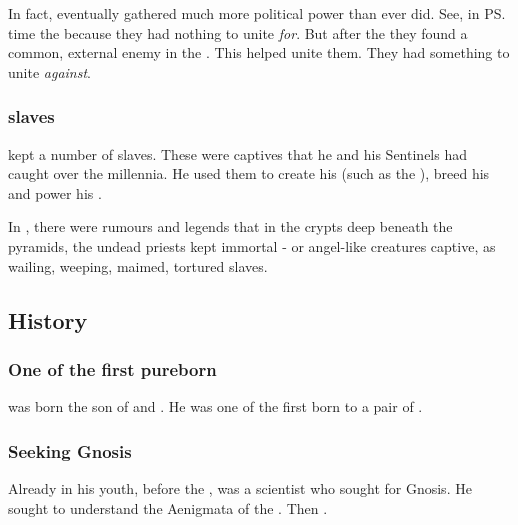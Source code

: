In fact, \Secherdamon{} eventually gathered much more political power than \Nexagglachel{} ever did. 
See, in \ps{\Nexagglachel} time the  because they had nothing to unite \emph{for}. 
But after the \secondbanewar{} they found a common, external enemy in the \resphain.
This helped \Secherdamon{} unite them. 
They had something to unite \emph{against}. 





\subsubsection{\Resphan slaves}
\Secherdamon kept a number of \resphan slaves. 
These were captives that he and his Sentinels had caught over the millennia. 
He used them to create his  (such as the ), breed his  and power his .

In \Durcac, there were rumours and legends that in the crypts deep beneath the pyramids, the undead priests kept immortal \human- or angel-like creatures captive, as wailing, weeping, maimed, tortured slaves. 









\subsection{History}





\subsubsection{One of the first pureborn \dragons}
\Secherdamon was born the son of \Tiamat and \ApepNesthra. 
He was one of the first \ophidians born to a pair of \dragons. 





\subsubsection{Seeking Gnosis}
Already in his youth, before the \secondbanewar, \Secherdamon{} was a scientist who sought for Gnosis. 
He sought to understand the Aenigmata of the \xss. 
Then .

